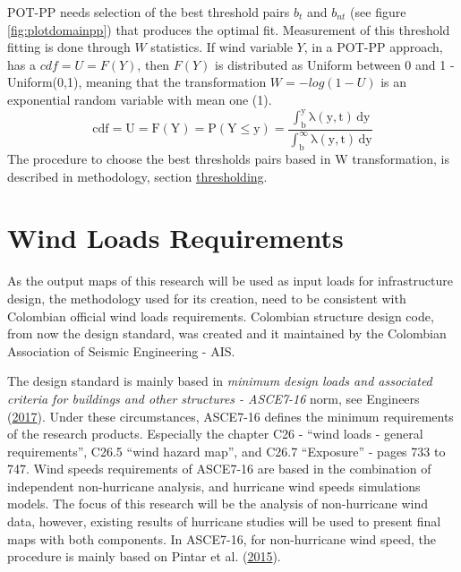 \documentclass[12pt,oneside]{reedthesis}
\begin{document}
POT-PP needs selection of the best threshold pairs \(b_t\) and \(b_{nt}\) (see figure \ref{fig:plotdomainpp}) that produces the optimal fit. Measurement of this threshold fitting is done through \(W\) statistics. If wind variable \(Y\), in a POT-PP approach, has a \(cdf = U = F(Y)\), then \(F(Y)\) is distributed as Uniform between 0 and 1 - Uniform(0,1), meaning that the transformation \(W = -log(1-U)\) is an exponential random variable with mean one (1).
\begin{equation}
  \mathrm{
            cdf = U= F(Y) = P(Y \leq y) = \frac{\int_b^y\lambda(y,t)\,dy}{\int_b^\infty\lambda(y,t)\,dy} 
         }
  \label{eq:ppcdf}
\end{equation}
The procedure to choose the best thresholds pairs based in W transformation, is described in methodology, section \protect\hyperlink{thresholding}{thresholding}.

\hypertarget{windloadsrequirements}{%
\section{Wind Loads Requirements}\label{windloadsrequirements}}

As the output maps of this research will be used as input loads for infrastructure design, the methodology used for its creation, need to be consistent with Colombian official wind loads requirements. Colombian structure design code, from now the design standard, was created and it maintained by the Colombian Association of Seismic Engineering - AIS.

The design standard is mainly based in \emph{minimum design loads and associated criteria for buildings and other structures - ASCE7-16} norm, see Engineers (\protect\hyperlink{ref-Asce2017}{2017}). Under these circumstances, ASCE7-16 defines the minimum requirements of the research products. Especially the chapter C26 - ``wind loads - general requirements'', C26.5 ``wind hazard map'', and C26.7 ``Exposure'' - pages 733 to 747. Wind speeds requirements of ASCE7-16 are based in the combination of independent non-hurricane analysis, and hurricane wind speeds simulations models. The focus of this research will be the analysis of non-hurricane wind data, however, existing results of hurricane studies will be used to present final maps with both components. In ASCE7-16, for non-hurricane wind speed, the procedure is mainly based on Pintar et al. (\protect\hyperlink{ref-Pintar2015}{2015}).
\end{document}

